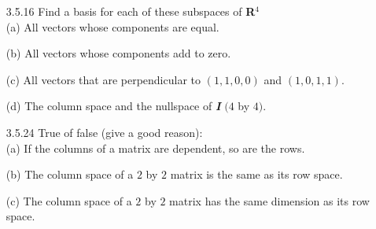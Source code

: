 \documentclass[10pt,twoside,reqno]{article}
\begin{document}
\begin{enumerate}
\item[3.5.16]  Find a basis for each of these subspaces of \textbf{R}$^4$\\
(a) All vectors whose components are equal.\\
\vspace{3mm}



(b) All vectors whose components add to zero.\\
\vspace{3mm}



(c) All vectors that are perpendicular to $(1, 1, 0, 0)$ and $(1, 0, 1, 1)$.\\
\vspace{3mm}



(d) The column space and the nullspace of \textit{\textbf{I}} $(4$ by $4)$.\\
\vspace{3mm}



\item[3.5.24] True of false (give a good reason):\\
(a) If the columns of a matrix are dependent, so are the rows.\\
\vspace{3mm} 



(b) The column space of a $2$ by $2$ matrix is the same as its row space.\\
\vspace{3mm} 



(c) The column space of a $2$ by $2$ matrix has the same dimension as its row space.\\
\vspace{3mm} 




\end{enumerate}
\end{document}
